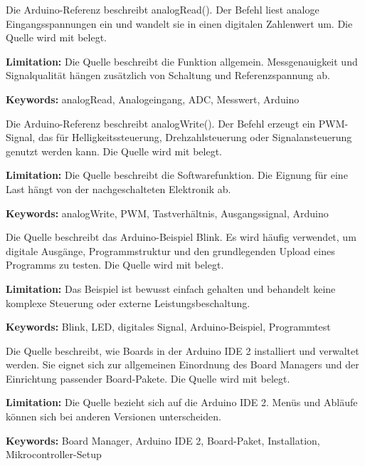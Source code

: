 
{ 
	Die Arduino-Referenz beschreibt analogRead(). Der Befehl liest analoge Eingangsspannungen ein und wandelt sie in einen digitalen Zahlenwert um. Die Quelle wird mit \cite{arduino:analogread} belegt.
	
	\bigskip
	
	\textbf{Limitation:} Die Quelle beschreibt die Funktion allgemein. Messgenauigkeit und Signalqualität hängen zusätzlich von Schaltung und Referenzspannung ab.
	
	\scriptsize{\textbf{Keywords:} analogRead, Analogeingang, ADC, Messwert, Arduino}
}



{ 
	Die Arduino-Referenz beschreibt analogWrite(). Der Befehl erzeugt ein PWM-Signal, das für Helligkeitssteuerung, Drehzahlsteuerung oder Signalansteuerung genutzt werden kann. Die Quelle wird mit \cite{arduino:analogwrite} belegt.
	
	\bigskip
	
	\textbf{Limitation:} Die Quelle beschreibt die Softwarefunktion. Die Eignung für eine Last hängt von der nachgeschalteten Elektronik ab.
	
	\scriptsize{\textbf{Keywords:} analogWrite, PWM, Tastverhältnis, Ausgangssignal, Arduino}
}



{ 
	Die Quelle beschreibt das Arduino-Beispiel Blink. Es wird häufig verwendet, um digitale Ausgänge, Programmstruktur und den grundlegenden Upload eines Programms zu testen. Die Quelle wird mit \cite{arduino:blink} belegt.
	
	\bigskip
	
	\textbf{Limitation:} Das Beispiel ist bewusst einfach gehalten und behandelt keine komplexe Steuerung oder externe Leistungsbeschaltung.
	
	\scriptsize{\textbf{Keywords:} Blink, LED, digitales Signal, Arduino-Beispiel, Programmtest}
}



{ 
	Die Quelle beschreibt, wie Boards in der Arduino IDE 2 installiert und verwaltet werden. Sie eignet sich zur allgemeinen Einordnung des Board Managers und der Einrichtung passender Board-Pakete. Die Quelle wird mit \cite{arduino:boardmanager} belegt.
	
	\bigskip
	
	\textbf{Limitation:} Die Quelle bezieht sich auf die Arduino IDE 2. Menüs und Abläufe können sich bei anderen Versionen unterscheiden.
	
	\scriptsize{\textbf{Keywords:} Board Manager, Arduino IDE 2, Board-Paket, Installation, Mikrocontroller-Setup}
}



